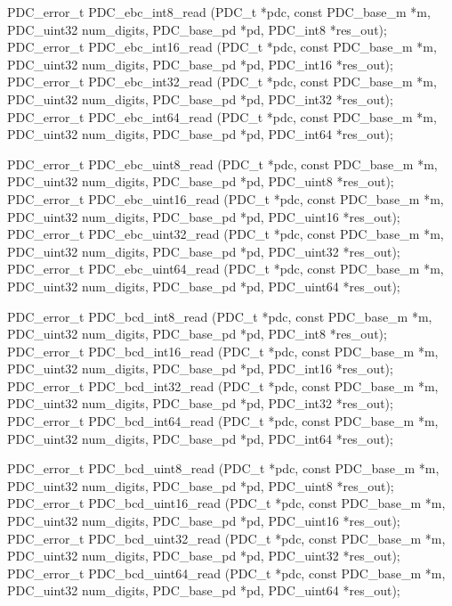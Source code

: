 \cBegin{}
\cEnd{}

\begin{tinycodeaux}{\leftmargin=0in}
\codeallowbreaks
PDC_error_t PDC_ebc_int8_read   (PDC_t *pdc, const PDC_base_m *m, PDC_uint32 num_digits,
				 PDC_base_pd *pd, PDC_int8 *res_out);
PDC_error_t PDC_ebc_int16_read  (PDC_t *pdc, const PDC_base_m *m, PDC_uint32 num_digits,
				 PDC_base_pd *pd, PDC_int16 *res_out);
PDC_error_t PDC_ebc_int32_read  (PDC_t *pdc, const PDC_base_m *m, PDC_uint32 num_digits,
				 PDC_base_pd *pd, PDC_int32 *res_out);
PDC_error_t PDC_ebc_int64_read  (PDC_t *pdc, const PDC_base_m *m, PDC_uint32 num_digits,
				 PDC_base_pd *pd, PDC_int64 *res_out);

PDC_error_t PDC_ebc_uint8_read  (PDC_t *pdc, const PDC_base_m *m, PDC_uint32 num_digits,
				 PDC_base_pd *pd, PDC_uint8 *res_out);
PDC_error_t PDC_ebc_uint16_read (PDC_t *pdc, const PDC_base_m *m, PDC_uint32 num_digits,
				 PDC_base_pd *pd, PDC_uint16 *res_out);
PDC_error_t PDC_ebc_uint32_read (PDC_t *pdc, const PDC_base_m *m, PDC_uint32 num_digits,
				 PDC_base_pd *pd, PDC_uint32 *res_out);
PDC_error_t PDC_ebc_uint64_read (PDC_t *pdc, const PDC_base_m *m, PDC_uint32 num_digits,
				 PDC_base_pd *pd, PDC_uint64 *res_out);

PDC_error_t PDC_bcd_int8_read   (PDC_t *pdc, const PDC_base_m *m, PDC_uint32 num_digits,
				 PDC_base_pd *pd, PDC_int8 *res_out);
PDC_error_t PDC_bcd_int16_read  (PDC_t *pdc, const PDC_base_m *m, PDC_uint32 num_digits,
				 PDC_base_pd *pd, PDC_int16 *res_out);
PDC_error_t PDC_bcd_int32_read  (PDC_t *pdc, const PDC_base_m *m, PDC_uint32 num_digits,
				 PDC_base_pd *pd, PDC_int32 *res_out);
PDC_error_t PDC_bcd_int64_read  (PDC_t *pdc, const PDC_base_m *m, PDC_uint32 num_digits,
				 PDC_base_pd *pd, PDC_int64 *res_out);

PDC_error_t PDC_bcd_uint8_read  (PDC_t *pdc, const PDC_base_m *m, PDC_uint32 num_digits,
				 PDC_base_pd *pd, PDC_uint8 *res_out);
PDC_error_t PDC_bcd_uint16_read (PDC_t *pdc, const PDC_base_m *m, PDC_uint32 num_digits,
				 PDC_base_pd *pd, PDC_uint16 *res_out);
PDC_error_t PDC_bcd_uint32_read (PDC_t *pdc, const PDC_base_m *m, PDC_uint32 num_digits,
				 PDC_base_pd *pd, PDC_uint32 *res_out);
PDC_error_t PDC_bcd_uint64_read (PDC_t *pdc, const PDC_base_m *m, PDC_uint32 num_digits,
				 PDC_base_pd *pd, PDC_uint64 *res_out);
\end{tinycodeaux}

